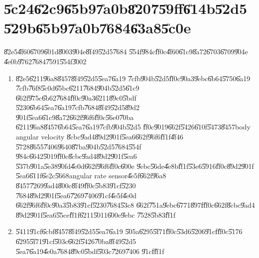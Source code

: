 \documentclass[12pt,a4paper]{article}
\begin{document}
%

\part{\U{5c24}\U{62c9}\U{65b9}\U{7a0b}\U{8207}\U{59ff}\U{614b}\U{52d5}%
\U{529b}\U{65b9}\U{7a0b}\U{7684}\U{63a8}\U{5c0e}}

\setcounter{page}{1}\bigskip

\U{82e5}\U{4f60}\U{6709}\U{601d}\U{8003}\U{904e}\U{8f49}\U{52d5}\U{7684}%
\U{554f}\U{984c}\U{ff0c}\U{4f60}\U{61c9}\U{8a72}\U{6703}\U{6709}\U{904e}%
\U{4e0b}\U{9762}\U{7684}\U{7591}\U{554f}\U{3002}

\begin{enumerate}
\item \U{82e5}\U{6211}\U{96a8}\U{8457}\U{8f49}\U{52d5}\U{5ea7}\U{6a19}%
\U{7cfb}\U{904b}\U{52d5}\U{ff0c}\U{90a3}\U{9ebc}\U{6b64}\U{5750}\U{6a19}%
\U{7cfb}\U{76f8}\U{5c0d}\U{65bc}\U{6211}\U{7684}\U{904b}\U{52d5}\U{61c9}%
\U{662f}\U{975c}\U{6b62}\U{7684}\U{ff0c}\U{90a3}\U{6211}\U{89c0}\U{5bdf}%
\U{5230}\U{6b64}\U{5ea7}\U{6a19}\U{7cfb}\U{7684}\U{8f49}\U{52d5}\U{89d2}%
\U{901f}\U{5ea6}\U{61c9}\U{8a72}\U{662f}\U{96f6}\U{ff0c}\U{56e0}\U{70ba}%
\U{6211}\U{96a8}\U{8457}\U{6b64}\U{5ea7}\U{6a19}\U{7cfb}\U{904b}\U{52d5}%
\U{ff0c}\U{9019}\U{662f}\U{5426}\U{610f}\U{5473}\U{8457}body angular velocity%
\U{8cbc}\U{9ad4}\U{89d2}\U{901f}\U{5ea6}\U{662f}\U{96f6}\U{ff1f}\U{4f46}%
\U{5728}\U{8655}\U{7406}\U{9640}\U{87ba}\U{904b}\U{52d5}\U{7684}\U{554f}%
\U{984c}\U{6642}\U{5019}\U{ff0c}\U{8cbc}\U{9ad4}\U{89d2}\U{901f}\U{5ea6}%
\U{537b}\U{901a}\U{5e38}\U{90fd}\U{4e0d}\U{662f}\U{96f6}\U{ff0c}\U{600e}%
\U{9ebc}\U{56de}\U{4e8b}\U{ff1f}\U{53e6}\U{5916}\U{ff0c}\U{89d2}\U{901f}%
\U{5ea6}\U{611f}\U{6e2c}\U{5668}angular rate sensor\U{4e5f}\U{662f}\U{96a8}%
\U{8457}\U{7269}\U{9ad4}\U{800c}\U{8f49}\U{ff0c}\U{5b83}\U{91cf}\U{5230}%
\U{7684}\U{89d2}\U{901f}\U{5ea6}\U{7269}\U{7406}\U{91cf}\U{4e5f}\U{4e0d}%
\U{662f}\U{96f6}\U{ff0c}\U{90a3}\U{5b83}\U{91cf}\U{5230}\U{7684}\U{53c8}%
\U{662f}\U{751a}\U{9ebc}\U{6771}\U{897f}\U{ff0c}\U{662f}\U{8cbc}\U{9ad4}%
\U{89d2}\U{901f}\U{5ea6}\U{55ce}\U{ff1f}\U{6211}\U{5011}\U{600e}\U{9ebc}%
\U{7528}\U{5b83}\U{ff1f}

\item \U{5411}\U{91cf}\U{6cbf}\U{8457}\U{8f49}\U{52d5}\U{5ea7}\U{6a19}%
\U{505a}\U{6295}\U{5f71}\U{ff0c}\U{53d6}\U{5206}\U{91cf}\U{ff0c}\U{5176}%
\U{6295}\U{5f71}\U{91cf}\U{503c}\U{662f}\U{5426}\U{70ba}\U{8f49}\U{52d5}%
\U{5ea7}\U{6a19}\U{4e0a}\U{7684}\U{89c0}\U{5bdf}\U{503c}\U{7269}\U{7406}%
\U{91cf}\U{ff1f}


\end{enumerate}
\end{document}
